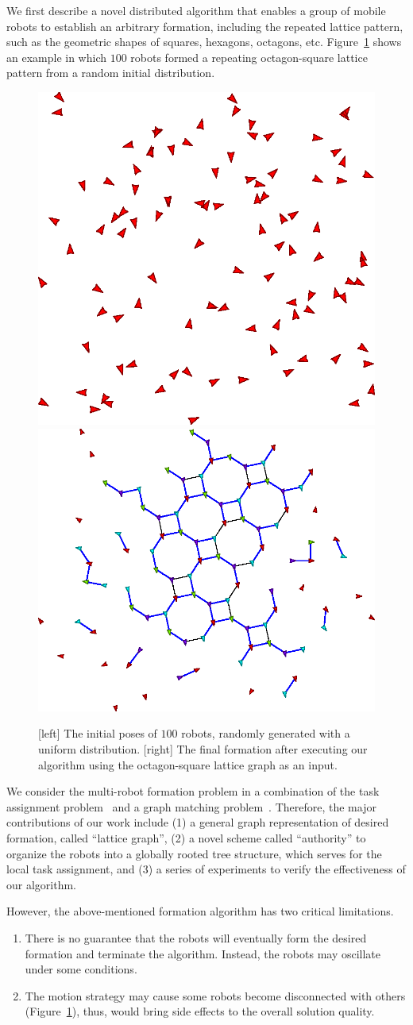 We first describe a novel distributed algorithm that enables a group of mobile
robots to establish an arbitrary formation, including the repeated lattice
pattern, such as the geometric shapes of squares, hexagons, octagons, etc.
Figure~\ref{fig:octsq-init-final} shows an example in which $100$ robots formed 
a repeating octagon-square lattice pattern from a random initial distribution.
\begin{figure}
  \centering
  \includegraphics[width=.4\columnwidth]{figs/initial-formation}
  \bigskip
  \includegraphics[width=.45\columnwidth]{figs/final-formation}
  \caption{[left] The initial poses of $100$ robots, randomly generated with a
  uniform distribution. [right] The final formation after executing our
  algorithm using the octagon-square lattice graph as an input.}
  \label{fig:octsq-init-final}
\end{figure}
We consider the multi-robot formation problem in a combination of the task
assignment problem~\cite{Kuh55, Mun57} and a graph matching
problem~\cite{Lov86}. Therefore, the major contributions of our work include (1)
a general graph representation of desired formation, called ``lattice graph'',
(2) a novel scheme called ``authority'' to organize the robots into a
globally rooted tree structure, which serves for the local task assignment, 
and (3) a series of experiments to verify the effectiveness of our algorithm.

However, the above-mentioned formation algorithm has two critical limitations.
\begin{enumerate}
\item There is no guarantee that the robots will eventually form the
  desired formation and terminate the algorithm. 
  Instead, the robots may oscillate under some conditions.
\item The motion strategy may cause some robots become
  disconnected with others (Figure~\ref{fig:octsq-init-final}), 
  thus, would bring side effects to the overall solution quality.
\end{enumerate}

